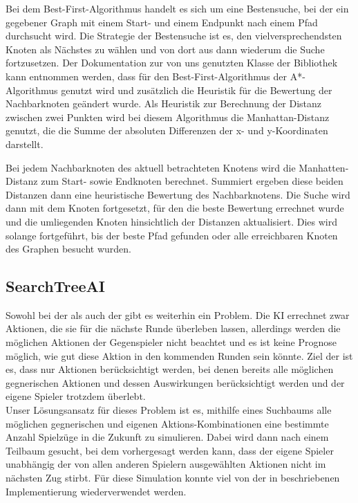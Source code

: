 Bei dem Best-First-Algorithmus handelt es sich um eine Bestensuche, bei der ein gegebener Graph mit einem Start- und
einem Endpunkt nach einem Pfad durchsucht wird.
Die Strategie der Bestensuche ist es, den vielversprechendsten Knoten als Nächstes zu wählen und von dort aus dann
wiederum die Suche fortzusetzen.
Der Dokumentation zur von uns genutzten Klasse  der Bibliothek  kann entnommen werden,
dass für den Best-First-Algorithmus der A*-Algorithmus genutzt wird und zusätzlich die Heuristik für die Bewertung der
Nachbarknoten geändert wurde.
Als Heuristik zur Berechnung der Distanz zwischen zwei Punkten wird bei diesem Algorithmus die Manhattan-Distanz
genutzt, die die Summe der absoluten Differenzen der x- und y-Koordinaten darstellt. 

Bei jedem Nachbarknoten des aktuell betrachteten Knotens wird die Manhatten-Distanz zum Start- sowie Endknoten
berechnet.
Summiert ergeben diese beiden Distanzen dann eine heuristische Bewertung des Nachbarknotens.
Die Suche wird dann mit dem Knoten fortgesetzt, für den die beste Bewertung errechnet wurde und die umliegenden Knoten
hinsichtlich der Distanzen aktualisiert.
Dies wird solange fortgeführt, bis der beste Pfad gefunden oder alle erreichbaren Knoten des Graphen besucht wurden.

\subsection{SearchTreeAI}
\label{subsec:searchtree-ai}

Sowohl bei der  als auch der  gibt es weiterhin ein Problem.
Die \ac{KI} errechnet zwar Aktionen, die sie für die nächste Runde überleben lassen, allerdings werden die möglichen
Aktionen der Gegenspieler nicht beachtet und es ist keine Prognose möglich, wie gut diese Aktion in den kommenden Runden
sein könnte.
Ziel der  ist es, dass nur Aktionen berücksichtigt werden, bei denen bereits alle möglichen
gegnerischen Aktionen und dessen Auswirkungen berücksichtigt werden und der eigene Spieler trotzdem überlebt. \\

Unser Lösungsansatz für dieses Problem ist es, mithilfe eines Suchbaums alle möglichen gegnerischen und eigenen
Aktions-Kombinationen eine bestimmte Anzahl Spielzüge in die Zukunft zu simulieren. 
Dabei wird dann nach einem Teilbaum gesucht, bei dem
vorhergesagt werden kann, dass der eigene Spieler unabhängig der von allen anderen Spielern ausgewählten Aktionen nicht
im nächsten Zug stirbt.
Für diese Simulation konnte viel von der in  beschriebenen Implementierung
wiederverwendet werden. \\


